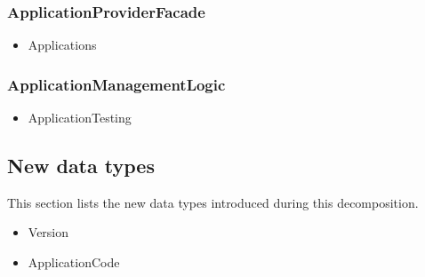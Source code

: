     \subsubsection{ApplicationProviderFacade}
        \begin{itemize}
            \item Applications
        \end{itemize}

    \subsubsection{ApplicationManagementLogic}
        \begin{itemize}
            \item ApplicationTesting
        \end{itemize}

\subsection*{New data types}
    This section lists the new data types introduced during this decomposition.

    \begin{itemize}
        \item Version
        \item ApplicationCode
    \end{itemize}
